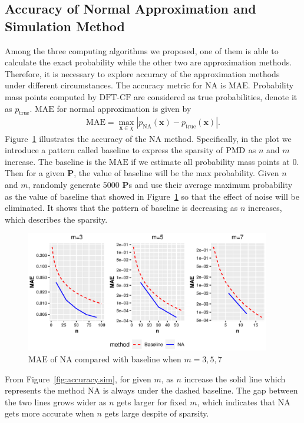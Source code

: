 \documentclass[12pt]{article}
\newcommand{\Pmat}{\mathbf{P}}
\newcommand{\MAE}{{\textrm{MAE}}}
\newcommand{\PMD}{{\normalfont\textrm{PMD}}}
\newcommand{\xvec}{\boldsymbol{x}}
\newcommand{\NA}{{\textrm{NA}}}
\newcommand{\dft}{{\textrm{DFT-CF}}}
\begin{document}
\subsection{Accuracy of Normal Approximation and Simulation Method}
Among the three computing algorithms we proposed, one of them is able to calculate the exact probability while the other two are approximation methods. Therefore, it is necessary to explore accuracy of the approximation methods under different circumstances. The accuracy metric for $\NA$ is $\MAE$. Probability mass points computed by $\dft$ are considered as true probabilities, denote it as $p_{\textrm{true}}$.
$\MAE$ for normal approximation is given by
\begin{align*}
    \MAE = \max_{\xvec \in \chi}|p_{\NA}(\xvec)-p_{\textrm{true}}(\xvec)|.
\end{align*}
Figure~\ref{fig:mae.na} illustrates the accuracy of the $\NA$ method. Specifically, in the plot we introduce a pattern called baseline to express the sparsity of $\PMD$ as $n$ and $m$ increase. The baseline is the $\MAE$ if we estimate all probability mass points at 0. Then for a given $\Pmat$, the value of baseline will be the max probability. Given $n$ and $m$,  randomly generate 5000 $\Pmat$s and use their average maximum probability as the value of baseline that showed in Figure~\ref{fig:mae.na} so that the effect of noise will be eliminated. It shows that the pattern of baseline is decreasing as $n$ increases, which describes the sparsity.
\begin{figure}%
\begin{center}
	\includegraphics[width=0.95\textwidth]{figures/normal_mae.eps}
	\caption{$\MAE$ of $\NA$ compared with baseline when $m=3,5,7$}
	\label{fig:mae.na}
\end{center}
\end{figure}
From Figure~\ref{fig:accuracy.sim}, for given $m$, as $n$ increase the solid line which represents the method $\NA$ is always under the dashed baseline. The gap between the two lines grows wider as $n$ gets larger for fixed $m$, which indicates that $\NA$ gets more accurate when $n$ gets large despite of sparsity.
\end{document}
